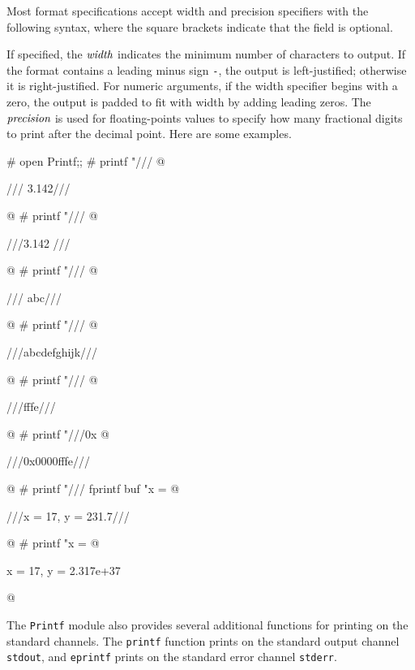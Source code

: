 Most format specifications accept width and precision specifiers with the following
syntax, where the square brackets indicate that the field is optional.
%
\begin{ocaml}
\end{ocaml}
%
If specified, the $\textit{width}$ indicates the minimum number of characters to output.  If the format
contains a leading minus sign \hbox{\lstinline+-+}, the output is left-justified; otherwise it is
right-justified.  For numeric arguments, if the width specifier begins with a zero, the output is
padded to fit with width by adding leading zeros.  The $\textit{precision}$ is used for floating-points
values to specify how many fractional digits to print after the decimal point.  Here are some
examples.

\begin{ocaml}
# open Printf;;
# printf "///%
@
\begin{topoutput}
///   3.142///
\end{topoutput}
@
# printf "///%
@
\begin{topoutput}
///3.142   ///
\end{topoutput}
@
# printf "///%
@
\begin{topoutput}
///     abc///
\end{topoutput}
@
# printf "///%
@
\begin{topoutput}
///abcdefghijk///
\end{topoutput}
@
# printf "///%
@
\begin{topoutput}
///fffe///
\end{topoutput}
@
# printf "///0x%
@
\begin{topoutput}
///0x0000fffe///

\end{topoutput}
@
# printf "///%
     fprintf buf "x = %
@
\begin{topoutput}
///x = 17, y = 231.7///
\end{topoutput}
@
# printf "x = %
@
\begin{topoutput}
x = 17, y = 2.317e+37
\end{topoutput}
@
\end{ocaml}
%
The \hbox{\lstinline$Printf$} module also provides several additional functions for printing on the
standard channels. The \hbox{\lstinline$printf$} function prints on the standard output
channel \hbox{\lstinline$stdout$}, and \hbox{\lstinline$eprintf$} prints
on the standard error channel \hbox{\lstinline$stderr$}.

